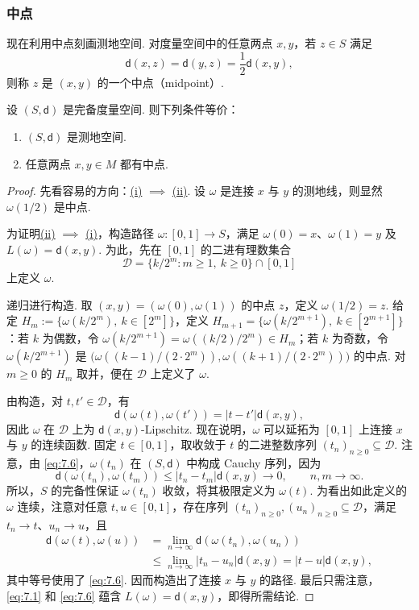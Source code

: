 \subsubsection{中点}\label{sec:7.1.2}
现在利用中点刻画测地空间. 对度量空间中的任意两点 $x,y$，若 $z\in S$ 满足
$$\mathsf d(x,z)=\mathsf d(y,z)=\frac12\mathsf d(x,y),$$
则称 $z$ 是 $(x,y)$ 的一个中点（midpoint）.
\begin{proposition}\label{prop:7.5}
设 $(S,\mathsf d)$ 是完备度量空间. 则下列条件等价：
\begin{enumerate}
\item[(i)]\label{item:7.5.i} $(S,\mathsf d)$ 是测地空间.
\item[(ii)]\label{item:7.5.ii} 任意两点 $x,y\in M$ 都有中点.
\end{enumerate}
\end{proposition}
\begin{proof}
先看容易的方向：\hyperref[item:7.5.i]{(i)} $\implies$ \hyperref[item:7.5.ii]{(ii)}. 设 $\omega$ 是连接 $x$ 与 $y$ 的测地线，则显然 $\omega(1/2)$ 是中点.

为证明\hyperref[item:7.5.ii]{(ii)} $\implies$ \hyperref[item:7.5.i]{(i)}，构造路径 $\omega:[0,1]\to S$，满足 $\omega(0)=x$、$\omega(1)=y$ 及 $L(\omega)=\mathsf d(x,y)$. 为此，先在 $[0,1]$ 的二进有理数集合
$$\mathcal D=\{k/2^m:m\ge1,\ k\ge0\}\cap[0,1]$$
上定义 $\omega$.

递归进行构造. 取 $(x,y)=(\omega(0),\omega(1))$ 的中点 $z$，定义 $\omega(1/2)=z$. 给定 $H_m:=\{\omega(k/2^m),\ k\in[2^m]\}$，定义 $H_{m+1}=\{\omega(k/2^{m+1}),\ k\in[2^{m+1}]\}$：若 $k$ 为偶数，令 $\omega(k/2^{m+1})=\omega((k/2)/2^m)\in H_m$；若 $k$ 为奇数，令 $\omega(k/2^{m+1})$ 是 $\bigl(\omega((k-1)/(2\cdot2^m)),\omega((k+1)/(2\cdot2^m))\bigr)$ 的中点. 对 $m\ge0$ 的 $H_m$ 取并，便在 $\mathcal D$ 上定义了 $\omega$.

由构造，对 $t,t'\in\mathcal D$，有
\begin{equation}\label{eq:7.6}\mathsf d(\omega(t),\omega(t'))=|t-t'|\mathsf d(x,y),\end{equation}
因此 $\omega$ 在 $\mathcal D$ 上为 $\mathsf d(x,y)$-Lipschitz. 现在说明，$\omega$ 可以延拓为 $[0,1]$ 上连接 $x$ 与 $y$ 的连续函数. 固定 $t\in[0,1]$，取收敛于 $t$ 的二进整数序列 $(t_n)_{n\ge0}\subseteq\mathcal D$. 注意，由 \eqref{eq:7.6}，$\omega(t_n)$ 在 $(S,\mathsf d)$ 中构成 Cauchy 序列，因为
$$\mathsf d(\omega(t_n),\omega(t_m))\le|t_n-t_m|\mathsf d(x,y)\to0,\qquad n,m\to\infty.$$
所以，$S$ 的完备性保证 $\omega(t_n)$ 收敛，将其极限定义为 $\omega(t)$. 为看出如此定义的 $\omega$ 连续，注意对任意 $t,u\in[0,1]$，存在序列 $(t_n)_{n\ge0},(u_n)_{n\ge0}\subseteq\mathcal D$，满足 $t_n\to t$、$u_n\to u$，且
$$\begin{aligned}
\mathsf d(\omega(t),\omega(u))
&=\lim_{n\to\infty}\mathsf d(\omega(t_n),\omega(u_n))\\
&\le\lim_{n\to\infty}|t_n-u_n|\mathsf d(x,y)=|t-u|\mathsf d(x,y),
\end{aligned}$$
其中等号使用了 \eqref{eq:7.6}. 因而构造出了连接 $x$ 与 $y$ 的路径. 最后只需注意，\eqref{eq:7.1} 和 \eqref{eq:7.6} 蕴含 $L(\omega)=\mathsf d(x,y)$，即得所需结论.
\end{proof}

